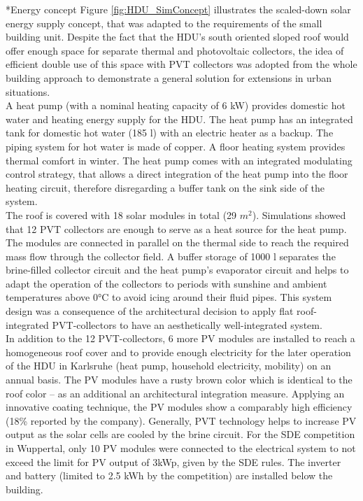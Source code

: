 \documentclass[twocolumn, a4paper,10pt]{article}
\makeatletter
\renewcommand\subsection{\@startsection{subsection}{1}{\z@}{\z@}{\z@}{\normalfont\normalsize\bfseries}}
\renewcommand\subsection{\@startsection{subsection}{1}{\z@}{\z@}{0.1pt}{\normalfont\normalsize\bfseries}}
\makeatother
\begin{document}
\subsection*{Energy concept}
Figure \ref{fig:HDU_SimConcept} illustrates the scaled-down solar energy supply concept, that was adapted to the requirements of the small building unit. Despite the fact that the HDU's south oriented sloped roof would offer enough space for separate thermal and photovoltaic collectors, the idea of efficient double use of this space with PVT collectors was adopted from the whole building approach to demonstrate a general solution for extensions in urban situations.\\ 
A heat pump (with a nominal heating capacity of 6 kW) provides domestic hot water and heating energy supply for the HDU. The heat pump has an integrated tank for domestic hot water (185 l) with an electric heater as a backup. The piping system for hot water is made of copper. A floor heating system provides thermal comfort in winter. The heat pump comes with an integrated modulating control strategy, that allows a direct integration of the heat pump into the floor heating circuit, therefore disregarding a buffer tank on the sink side of the system.\\
The roof is covered with 18 solar modules in total (29 $m^2$). Simulations showed that 12 PVT collectors are enough to serve as a heat source for the heat pump. The modules are connected in parallel on the thermal side to reach the required mass flow through the collector field. A buffer storage of 1000 l separates the brine-filled collector circuit and the heat pump's evaporator circuit and helps to adapt the operation of the collectors to periods with sunshine and ambient temperatures above 0°C to avoid icing around their fluid pipes. This system design was a consequence of the architectural decision to apply flat roof-integrated PVT-collectors to have an aesthetically well-integrated system.\\
In addition to the 12 PVT-collectors, 6 more PV modules are installed to reach a homogeneous roof cover and to provide enough electricity for the later operation of the HDU in Karlsruhe (heat pump, household electricity, mobility) on an annual basis. The PV modules have a rusty brown color which is identical to the roof color – as an additional an architectural integration measure. Applying an innovative coating technique, the PV modules show a comparably high efficiency (18\% reported by the company). Generally, PVT technology helps to increase PV output as the solar cells are cooled by the brine circuit. For the SDE competition in Wuppertal, only 10 PV modules were connected to the electrical system to not exceed the limit for PV output of 3kWp, given by the SDE rules. The inverter and battery (limited to 2.5 kWh by the competition) are installed below the building.\\
\end{document}
